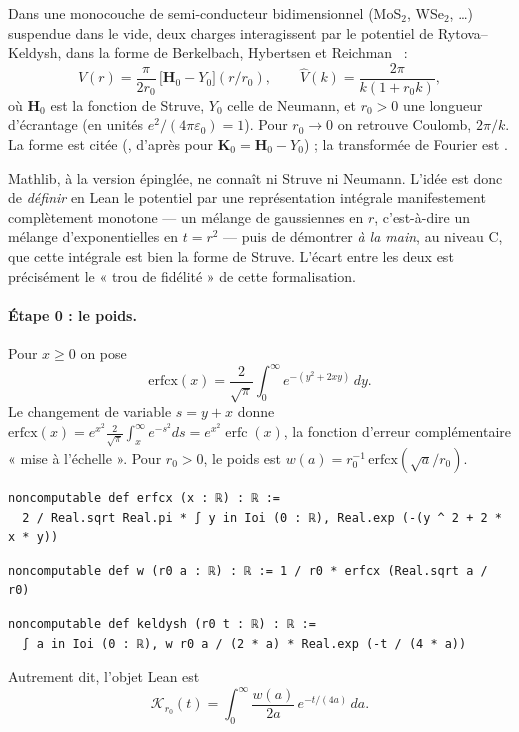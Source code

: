 \begin{physbox}
Dans une monocouche de semi-conducteur bidimensionnel (MoS$_2$, WSe$_2$, \dots) suspendue dans le vide, deux charges
interagissent par le potentiel de Rytova--Keldysh, dans la forme de Berkelbach, Hybertsen et Reichman~\cite{ch2bhr} :
\[V(r)=\frac{\pi}{2r_0}\,\bigl[\mathbf H_0-Y_0\bigr](r/r_0),\qquad \widehat V(k)=\frac{2\pi}{k(1+r_0k)},\]
où $\mathbf H_0$ est la fonction de Struve, $Y_0$ celle de Neumann, et $r_0>0$ une longueur d'écrantage
(en unités $e^2/(4\pi\varepsilon_0)=1$). Pour $r_0\to0$ on retrouve Coulomb, $2\pi/k$. La forme est citée \tierL{}
(\cite{ch2bhr}, d'après \cite{ch2dlmf} pour $\mathbf K_0=\mathbf H_0-Y_0$) ; la transformée de Fourier est \tierC.
\end{physbox}

Mathlib, à la version épinglée, ne connaît ni Struve ni Neumann. L'idée est donc de \emph{définir} en Lean le potentiel
par une représentation intégrale manifestement complètement monotone --- un mélange de gaussiennes en $r$, c'est-à-dire
un mélange d'exponentielles en $t=r^2$ --- puis de démontrer \emph{à la main}, au niveau C, que cette intégrale est bien
la forme de Struve. L'écart entre les deux est précisément le « trou de fidélité » de cette formalisation.

\paragraph{Étape 0 : le poids.} Pour $x\ge0$ on pose
\[\mathrm{erfcx}(x)=\frac{2}{\sqrt\pi}\int_0^\infty e^{-(y^2+2xy)}\,dy .\]
Le changement de variable $s=y+x$ donne $\mathrm{erfcx}(x)=e^{x^2}\frac2{\sqrt\pi}\int_x^\infty e^{-s^2}ds=e^{x^2}\operatorname{erfc}(x)$,
la fonction d'erreur complémentaire « mise à l'échelle ». Pour $r_0>0$, le poids est $w(a)=r_0^{-1}\,\mathrm{erfcx}(\sqrt a/r_0)$.
\begin{leanbox}
\begin{lstlisting}[style=chdeux]
noncomputable def erfcx (x : ℝ) : ℝ :=
  2 / Real.sqrt Real.pi * ∫ y in Ioi (0 : ℝ), Real.exp (-(y ^ 2 + 2 * x * y))
\end{lstlisting}
\begin{lstlisting}[style=chdeux]
noncomputable def w (r0 a : ℝ) : ℝ := 1 / r0 * erfcx (Real.sqrt a / r0)
\end{lstlisting}
\begin{lstlisting}[style=chdeux]
noncomputable def keldysh (r0 t : ℝ) : ℝ :=
  ∫ a in Ioi (0 : ℝ), w r0 a / (2 * a) * Real.exp (-t / (4 * a))
\end{lstlisting}
\end{leanbox}
\noindent Autrement dit, l'objet Lean est
\begin{equation}\label{ch2:eq:kmix}
\mathcal K_{r_0}(t)=\int_0^\infty\frac{w(a)}{2a}\,e^{-t/(4a)}\,da .
\end{equation}

